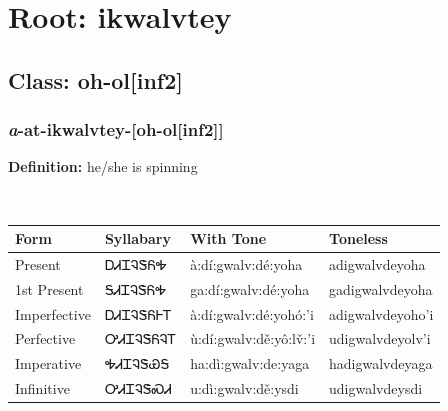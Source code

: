 \needspace{4in}
\section*{Root: ikwalvtey}
\nopagebreak
{}
\needspace{3in}
\subsection*{Class: oh-ol[inf2]}
\nopagebreak
\needspace{2in}
\subsubsection*{\textit{a}{-}at{-}\textbf{ikwalvtey}{-}[oh-ol[inf2]]}
\nopagebreak
\textbf{Definition: } he/she is spinning
\\[0.5em]
\begin{tabularx}{\textwidth}{l X X X}%
\toprule%
\textbf{Form}&\textbf{Syllabary}&\textbf{With Tone}&\textbf{Toneless}\\%
\midrule%
Present&ᎠᏗᏆᎸᏕᏲᎭ&à:dí:gwalv:dé:yoha&adigwalvdeyoha\\%
1st Present&ᎦᏗᏆᎸᏕᏲᎭ&ga:dí:gwalv:dé:yoha&gadigwalvdeyoha\\%
Imperfective&ᎠᏗᏆᎸᏕᏲᎰᎢ&à:dí:gwalv:dé:yohó:’i&adigwalvdeyoho’i\\%
Perfective&ᎤᏗᏆᎸᏕᏲᎸᎢ&ù:dí:gwalv:dě:yô:lv̌:’i&udigwalvdeyolv’i\\%
Imperative&ᎭᏗᏆᎸᏕᏯᎦ&ha:dì:gwalv:de:yaga&hadigwalvdeyaga\\%
Infinitive&ᎤᏗᏆᎸᏕᏍᏗ&u:dì:gwalv:dě:ysdi&udigwalvdeysdi\\%
\bottomrule%
\end{tabularx}
\\[1em]